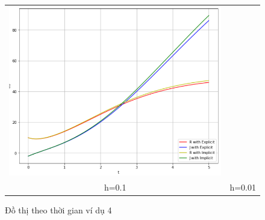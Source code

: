 \documentclass[a4paper]{article}
\begin{document}
\begin{enumerate}
\begin{enumerate}
\begin{figure}[htp]
\begin{tabular}{cc}
        \includegraphics[scale = .58]{Images/Bt4/vd4/h=0.01.png} \\
        h=0.1 & h=0.01
    \end{tabular}
    \caption{Đồ thị theo thời gian ví dụ 4}
\end{figure}


\end{enumerate}
\end{enumerate}
\end{document}
